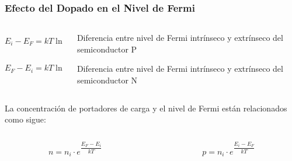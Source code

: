 \documentclass[10pt,t,aspectratio=169]{beamer}
\begin{document}
\begin{frame}[t]
  \frametitle{Efecto del Dopado en el Nivel de Fermi}

  \begin{columns}
    \begin{column}{0.4\textwidth}
      \[ E_i - E_F = kT \ln \dfrac{N_A}{n_i} \]
      
      \vspace{5mm}
      \[ E_F - E_i = kT \ln \dfrac{N_D}{n_i} \]
    \end{column}
    \begin{column}{0.6\textwidth}
      \centering
      Diferencia entre nivel de Fermi intrínseco y extrínseco del semiconductor P

      \vspace{5mm}
      Diferencia entre nivel de Fermi intrínseco y extrínseco del semiconductor N      
    \end{column}
  \end{columns}

  \vspace{5mm}
  La concentración de portadores de carga y el nivel de Fermi están relacionados como sigue:

  \vspace{5mm}
  \begin{columns}
    \begin{column}{0.5\textwidth}
      \[ n = n_i \cdot e^{\dfrac{E_F - E_i}{kT}} \]
    \end{column}
    \begin{column}{0.5\textwidth}
      \[ p = n_i \cdot e^{\dfrac{E_i - E_F}{kT}} \]
    \end{column}
  \end{columns}
\end{frame}
\end{document}

